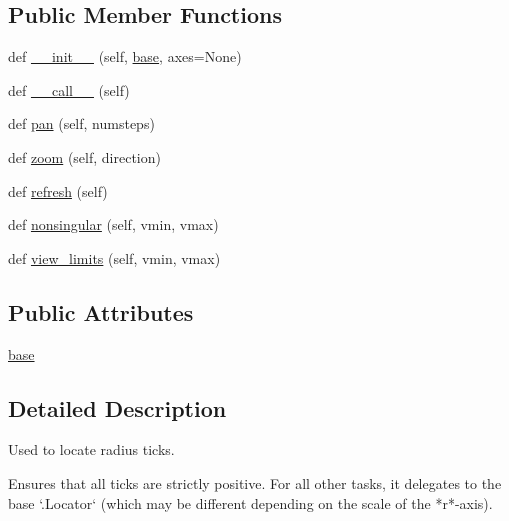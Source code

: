 \subsection*{Public Member Functions}
\begin{DoxyCompactItemize}
\item 
def \hyperlink{classmatplotlib_1_1projections_1_1polar_1_1RadialLocator_ad012c8244f37673a23b362d46c89154f}{\+\_\+\+\_\+init\+\_\+\+\_\+} (self, \hyperlink{classmatplotlib_1_1projections_1_1polar_1_1RadialLocator_ae76f936876413504581d9d63cd80c700}{base}, axes=None)
\item 
def \hyperlink{classmatplotlib_1_1projections_1_1polar_1_1RadialLocator_afc2f30cbbdbb5ca4556b140674cb1a6e}{\+\_\+\+\_\+call\+\_\+\+\_\+} (self)
\item 
def \hyperlink{classmatplotlib_1_1projections_1_1polar_1_1RadialLocator_a6de46fbd3b2511d16eca8255421fbc09}{pan} (self, numsteps)
\item 
def \hyperlink{classmatplotlib_1_1projections_1_1polar_1_1RadialLocator_a5fc04d7894eb6958c6772e2cebe4166e}{zoom} (self, direction)
\item 
def \hyperlink{classmatplotlib_1_1projections_1_1polar_1_1RadialLocator_a94540d96bd18572d44c8ba48175dc807}{refresh} (self)
\item 
def \hyperlink{classmatplotlib_1_1projections_1_1polar_1_1RadialLocator_ac956ed205019c5fb42346c0f2f88623e}{nonsingular} (self, vmin, vmax)
\item 
def \hyperlink{classmatplotlib_1_1projections_1_1polar_1_1RadialLocator_a0d6610557ad6e1d482c3a7ca2cfc1350}{view\+\_\+limits} (self, vmin, vmax)
\end{DoxyCompactItemize}
\subsection*{Public Attributes}
\begin{DoxyCompactItemize}
\item 
\hyperlink{classmatplotlib_1_1projections_1_1polar_1_1RadialLocator_ae76f936876413504581d9d63cd80c700}{base}
\end{DoxyCompactItemize}


\subsection{Detailed Description}
\begin{DoxyVerb}Used to locate radius ticks.

Ensures that all ticks are strictly positive.  For all other tasks, it
delegates to the base `.Locator` (which may be different depending on the
scale of the *r*-axis).
\end{DoxyVerb}
 

